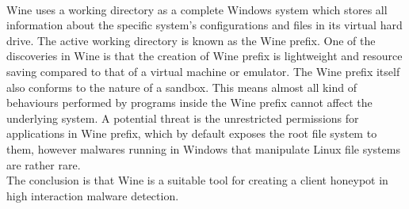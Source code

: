 \paragraph{}
Wine uses a working directory as a complete Windows system which stores all 
information about the specific system's configurations and files in its virtual 
hard drive. The active working directory is known as the Wine prefix. 
One of the discoveries in Wine is that the creation of Wine prefix is 
lightweight and resource saving compared to that of a virtual machine or
emulator. The Wine prefix itself also conforms to the nature of a 
sandbox. This means almost all kind of behaviours performed 
by programs inside the Wine prefix cannot affect the underlying system. 
A potential threat is the unrestricted permissions 
for applications in Wine prefix, which by default exposes the root file 
system to them, however malwares running in Windows that manipulate Linux 
file systems are rather rare. \\
The conclusion is that Wine is a suitable 
tool for creating a client honeypot in high interaction malware detection. 

